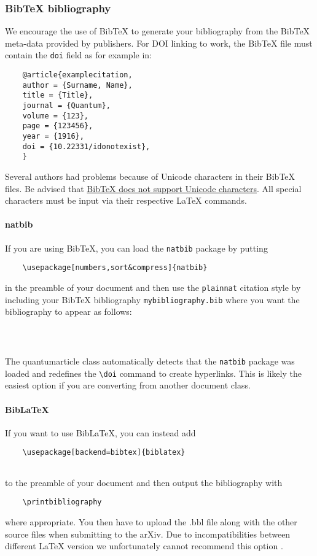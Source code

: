 \documentclass[a4paper,noarxiv,onecolumn]{quantumarticle}
\begin{document}
	\subsubsection{BibTeX bibliography}
	We encourage the use of BibTeX to generate your bibliography from the BibTeX meta-data provided by publishers.
	For DOI linking to work, the BibTeX file must contain the \texttt{doi} field as for example in:
	\begin{verbatim}
	@article{examplecitation,
	author = {Surname, Name},
	title = {Title},
	journal = {Quantum},
	volume = {123},
	page = {123456},
	year = {1916},
	doi = {10.22331/idonotexist},
	}
	\end{verbatim}
	Several authors had problems because of Unicode characters in their BibTeX files.
	Be advised that \href{http://wiki.lyx.org/BibTeX/Tips}{BibTeX does not support Unicode characters}.
	All special characters must be input via their respective LaTeX commands.
	
	\paragraph{natbib}
	If you are using BibTeX, you can load the \texttt{natbib} package by putting
	\begin{verbatim}
	\usepackage[numbers,sort&compress]{natbib}
	\end{verbatim}
	in the preamble of your document and then use the \texttt{plainnat} citation style by including your BibTeX bibliography \texttt{mybibliography.bib} where you want the bibliography to appear as follows:
	\begin{verbatim}
	
	
	\end{verbatim}
	The quantumarticle class automatically detects that the \texttt{natbib} package was loaded and redefines the \texttt{\textbackslash{}doi} command to create hyperlinks.
	This is likely the easiest option if you are converting from another document class.
	
	\paragraph{BibLaTeX}
	If you want to use BibLaTeX, you can instead add
	\begin{verbatim}
	\usepackage[backend=bibtex]{biblatex}
	
	\end{verbatim}
	to the preamble of your document and then output the bibliography with
	\begin{verbatim}
	\printbibliography
	\end{verbatim}
	where appropriate.
	You then have to upload the .bbl file along with the other source files when submitting to the arXiv.
	Due to incompatibilities between different LaTeX version we unfortunately cannot recommend this option \cite{biblatexsubmittingtothearxiv}.
	
\end{document}
